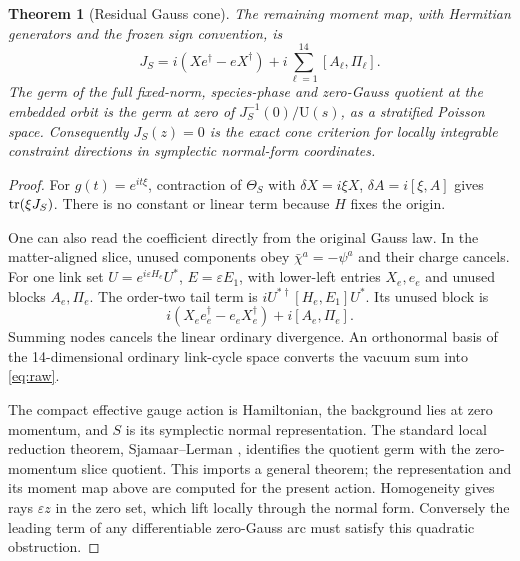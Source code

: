 \documentclass[11pt,a4paper]{article}
\newtheorem{theorem}{Theorem}\newtheorem{lemma}[theorem]{Lemma}\newtheorem{proposition}[theorem]{Proposition}
\begin{document}
\begin{theorem}[Residual Gauss cone]\label{th:cone}
The remaining moment map, with Hermitian generators and the frozen sign convention, is
\begin{equation}
\boxed{J_S=i(Xe^\dagger-eX^\dagger)+i\sum_{\ell=1}^{14}[A_\ell,\Pi_\ell].}\label{eq:raw}
\end{equation}
The germ of the full fixed-norm, species-phase and zero-Gauss quotient at the embedded orbit is the germ at zero of $J_S^{-1}(0)/\mathrm U(s)$, as a stratified Poisson space. Consequently $J_S(z)=0$ is the exact cone criterion for locally integrable constraint directions in symplectic normal-form coordinates.
\end{theorem}
\begin{proof}
For $g(t)=e^{it\xi}$, contraction of $\Theta_S$ with $\delta X=i\xi X$, $\delta A=i[\xi,A]$ gives $\operatorname{tr}(\xi J_S)$. There is no constant or linear term because $H$ fixes the origin.

One can also read the coefficient directly from the original Gauss law. In the matter-aligned slice, unused components obey $\bar\chi^a=-\psi^a$ and their charge cancels. For one link set $U=e^{i\varepsilon H_e}U^*$, $E=\varepsilon E_1$, with lower-left entries $X_e,e_e$ and unused blocks $A_e,\Pi_e$. The order-two tail term is $iU^{*\dagger}[H_e,E_1]U^*$. Its unused block is
\[
i(X_e e_e^\dagger-e_eX_e^\dagger)+i[A_e,\Pi_e].
\]
Summing nodes cancels the linear ordinary divergence. An orthonormal basis of the 14-dimensional ordinary link-cycle space converts the vacuum sum into \eqref{eq:raw}.

The compact effective gauge action is Hamiltonian, the background lies at zero momentum, and $S$ is its symplectic normal representation. The standard local reduction theorem, Sjamaar--Lerman \cite[Theorem 5.1]{SL}, identifies the quotient germ with the zero-momentum slice quotient. This imports a general theorem; the representation and its moment map above are computed for the present action. Homogeneity gives rays $\varepsilon z$ in the zero set, which lift locally through the normal form. Conversely the leading term of any differentiable zero-Gauss arc must satisfy this quadratic obstruction.
\end{proof}

\newpage
\end{document}
